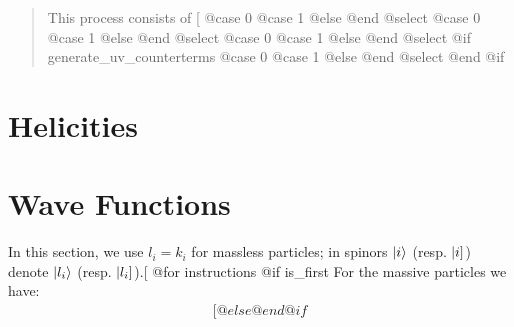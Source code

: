{{{{\maketitle
\begin{abstract}
\noindent This process consists of [%
 @case 0 %
 @case 1 %
 @else %
 @end @select %
 @case 0 %
 @case 1 %
 @else %
 @end @select %
    @case 0%
    @case 1%
    @else %
 @end @select %
 @if generate_uv_counterterms
 @case 0 %
 @case 1 %
 @else %
 @end @select %
 @end @if %
\end{abstract}
\newpage
\tableofcontents
\newpage

\section{Helicities}

\section{Wave Functions}
In this section, we use $l_i=k_i$ for massless particles;
in spinors $$ (resp. $$) denote $$ (resp. $$).[%
@for instructions %
   @if is_first %
For the massive particles we have:
\begin{align}[%
   @else %
   @end @if %


\end{align}}}}}
